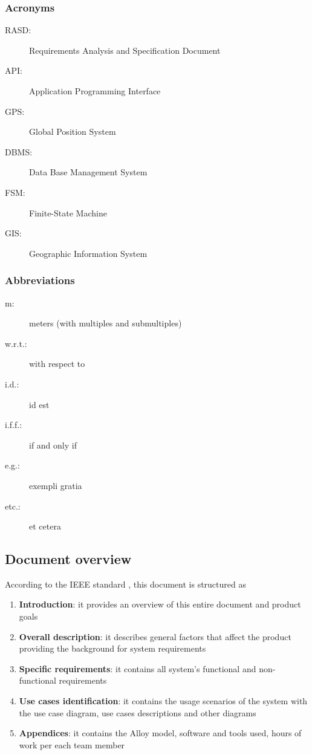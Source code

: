 \subsubsection{Acronyms}
	\begin{description}
		\item [RASD:] Requirements Analysis and Specification Document
		\item [API:] Application Programming Interface
		\item [GPS:] Global Position System
		\item [DBMS:] Data Base Management System
		\item [FSM:] Finite-State Machine
		\item [GIS:] Geographic Information System
	\end{description}
\subsubsection{Abbreviations}
	\begin{description}
		\item [m:] meters (with multiples and submultiples)
		\item [w.r.t.:] with respect to
		\item [i.d.:] id est
		\item [i.f.f.:] if and only if
		\item [e.g.:] exempli gratia
		\item [etc.:] et cetera
	\end{description}

\subsection{Document overview}
According to the IEEE standard \cite{IeeeRasd}, this document is structured as
\begin{enumerate}
	\item \textbf{Introduction}: it provides an overview of this entire document and product goals
	\item \textbf{Overall description}: it describes general factors that affect the product providing the background for system requirements
	\item \textbf{Specific requirements}: it contains all system's functional and non-functional requirements
	\item \textbf{Use cases identification}: it contains the usage scenarios of the system with the use case diagram, use cases descriptions and other diagrams
	\item \textbf{Appendices}: it contains the Alloy model, software and tools used, hours of work per each team member
\end{enumerate}